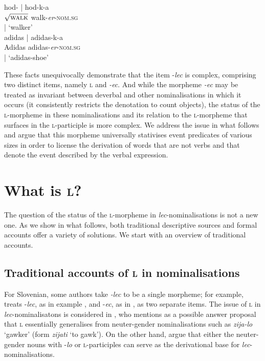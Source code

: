\documentclass[output=paper,colorlinks,citecolor=brown]{langscibook}
\begin{document}
\ex \glll hod-  %
| hod-k-a \\ 
 $\sqrt{\textsc{walk}}$ {} walk-\textit{er}-\textsc{nom.sg} {} \\ 
{} | `walker' \label{ex:hodka}\\


\ex \glll adidas  %
|  adidas-k-a \\ 
 Adidas {} adidas-\textit{er}-\textsc{nom.sg} \\ 
{} | `adidas-shoe'\\
\z \z


\noindent These facts unequivocally demonstrate that the item -\textit{lec} is complex, comprising two distinct items, namely \textsc{l} and \textit{-ec}. And while the morpheme \textit{-ec} may be treated as invariant between deverbal and other nominalisations in which it occurs (it consistently  restricts the denotation to count objects), the status of the \textsc{l}-morpheme in these nominalisations and its relation to the \textsc{l}-morpheme that surfaces in the \textsc{l}-participle is more complex. We address the issue in what follows and argue that this morpheme universally stativises event predicates of various sizes in order to license the derivation of words that are not verbs and that denote the event described by the verbal expression.


\section{What is \textsc{l}? \label{sec:whatisl}}
\largerpage

\noindent The question of the status of the \textsc{l}-morpheme in \textit{lec}-nominalisations is not a new one. As we show in what follows, both traditional descriptive sources and formal accounts offer a variety of solutions. We start with an overview of traditional accounts.  


\subsection{Traditional accounts of \textsc{l} in nominalisations}
For Slovenian, some authors take \textit{-lec} to be a single morpheme; for example, \citet[]{sim+:toporisic2000} treats -\textit{lec}, as in example , and -\textit{ec}, as in , as two separate items. The issue of \textsc{l} in \textit{lec}-nominalisatons is considered in \citet[]{stramljic1999}, who mentions as a possible answer  proposal that  \textsc{l} essentially generalises from neuter-gender nominalisations such as \textit{zija-lo} `gawker' (form
\textit{zijati} `to gawk'). On the other hand, \citet[]{bajec1956slovenska} argue that either the neuter-gender nouns with -\textit{lo} or \textsc{l}-participles can serve as the derivational base for \textit{lec}-nominalisations.  
\end{document}
